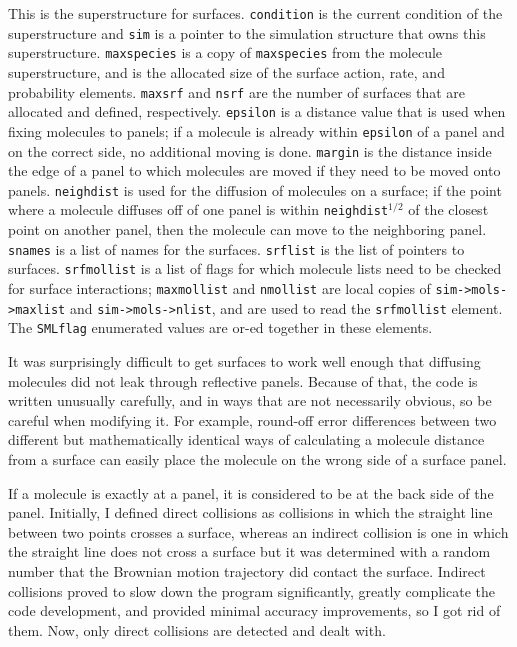 \documentclass {book}
\newcommand {\ttt} {\texttt}
\begin{document}
This is the superstructure for surfaces. \ttt{condition} is the current condition of the superstructure and \ttt{sim} is a pointer to the simulation structure that owns this superstructure. \ttt{maxspecies} is a copy of \ttt{maxspecies} from the molecule superstructure, and is the allocated size of the surface action, rate, and probability elements. \ttt{maxsrf} and \ttt{nsrf} are the number of surfaces that are allocated and defined, respectively. \ttt{epsilon} is a distance value that is used when fixing molecules to panels; if a molecule is already within \ttt{epsilon} of a panel and on the correct side, no additional moving is done. \ttt{margin} is the distance inside the edge of a panel to which molecules are moved if they need to be moved onto panels. \ttt{neighdist} is used for the diffusion of molecules on a surface; if the point where a molecule diffuses off of one panel is within \ttt{neighdist}$^{1/2}$ of the closest point on another panel, then the molecule can move to the neighboring panel. \ttt{snames} is a list of names for the surfaces. \ttt{srflist} is the list of pointers to surfaces. \ttt{srfmollist} is a list of flags for which molecule lists need to be checked for surface interactions; \ttt{maxmollist} and \ttt{nmollist} are local copies of \ttt{sim->mols->maxlist} and \ttt{sim->mols->nlist}, and are used to read the \ttt{srfmollist} element. The \ttt{SMLflag} enumerated values are or-ed together in these elements.

It was surprisingly difficult to get surfaces to work well enough that diffusing molecules did not leak through reflective panels. Because of that, the code is written unusually carefully, and in ways that are not necessarily obvious, so be careful when modifying it. For example, round-off error differences between two different but mathematically identical ways of calculating a molecule distance from a surface can easily place the molecule on the wrong side of a surface panel.

If a molecule is exactly at a panel, it is considered to be at the back side of the panel. Initially, I defined direct collisions as collisions in which the straight line between two points crosses a surface, whereas an indirect collision is one in which the straight line does not cross a surface but it was determined with a random number that the Brownian motion trajectory did contact the surface. Indirect collisions proved to slow down the program significantly, greatly complicate the code development, and provided minimal accuracy improvements, so I got rid of them. Now, only direct collisions are detected and dealt with.\newline
\end{document}
